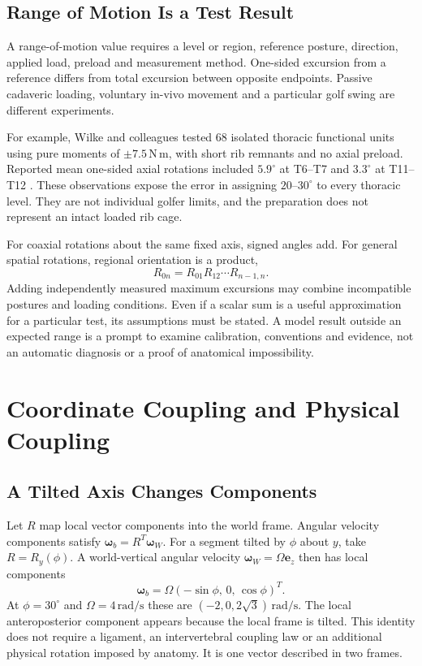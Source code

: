 \subsection{Range of Motion Is a Test Result}
A range-of-motion value requires a level or region, reference posture, direction, applied load, preload and measurement method. One-sided excursion from a reference differs from total excursion between opposite endpoints. Passive cadaveric loading, voluntary in-vivo movement and a particular golf swing are different experiments.

For example, Wilke and colleagues tested 68 isolated thoracic functional units using pure moments of $\pm7.5\,\mathrm{N\,m}$, with short rib remnants and no axial preload. Reported mean one-sided axial rotations included $5.9^{\circ}$ at T6--T7 and $3.3^{\circ}$ at T11--T12 \citep{Wilke2017ThoracicFlexibility}. These observations expose the error in assigning $20$--$30^{\circ}$ to every thoracic level. They are not individual golfer limits, and the preparation does not represent an intact loaded rib cage.

For coaxial rotations about the same fixed axis, signed angles add. For general spatial rotations, regional orientation is a product,
\begin{equation}
R_{0n}=R_{01}R_{12}\cdots R_{n-1,n}.
\end{equation}
Adding independently measured maximum excursions may combine incompatible postures and loading conditions. Even if a scalar sum is a useful approximation for a particular test, its assumptions must be stated. A model result outside an expected range is a prompt to examine calibration, conventions and evidence, not an automatic diagnosis or a proof of anatomical impossibility.

\section{Coordinate Coupling and Physical Coupling}
\label{sec:flexion_rotation_coupling}

\subsection{A Tilted Axis Changes Components}
Let $R$ map local vector components into the world frame. Angular velocity components satisfy $\bm\omega_b=R^T\bm\omega_W$. For a segment tilted by $\phi$ about $y$, take $R=R_y(\phi)$. A world-vertical angular velocity $\bm\omega_W=\Omega\bm e_z$ then has local components
\begin{equation}
\bm\omega_b=\Omega(-\sin\phi,\,0,\,\cos\phi)^T.
\end{equation}
At $\phi=30^{\circ}$ and $\Omega=4\,\mathrm{rad/s}$ these are $(-2,0,2\sqrt3)\,\mathrm{rad/s}$. The local anteroposterior component appears because the local frame is tilted. This identity does not require a ligament, an intervertebral coupling law or an additional physical rotation imposed by anatomy. It is one vector described in two frames.

